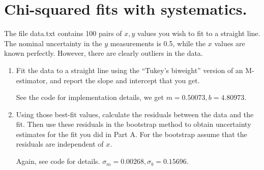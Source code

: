 \section{Chi-squared fits with systematics.}

The file data.txt contains 100 pairs of $x, y$ values you wish to fit to a straight line. The nominal uncertainty in the $y$ measurements is 0.5, while the $x$ values are known perfectly. However, there are clearly outliers in the data.

\begin{enumerate}[label=\textbf{\Alph*}.]
    \item Fit the data to a straight line using the ``Tukey's biweight'' version of an M-estimator, and report the slope and intercept that you get.
    
    See the code for implementation details, we get $m=0.50073, b=4.80973$.

    \item Using those best-fit values, calculate the residuals between the data and the fit. Then use these residuals in the bootstrap method to obtain uncertainty estimates for the fit you did in Part A. For the bootstrap assume that the residuals are independent of $x$.

    Again, see code for details. $\sigma_m=0.00268, \sigma_b=0.15696$.

\end{enumerate}
